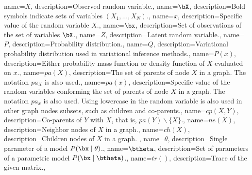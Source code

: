 {
  name={\(X\)},
  description={Observed random variable.},
}
{
  name={\(\bX\)},
  description={Bold symbols indicate sets of variables \((X_{1},\dots,X_{N})\).},
}
{
  name={\(x\)},
  description={Specific value of the random variable \(X\).},
}
{
  name={\(\bx\)},
  description={Set of observations of the set of variables \(\bX\).},
}
{
  name={\ensuremath{Z}},
  description={Latent random variable.},
}
{
  name={\ensuremath{P}},
  description={Probability distribution.},
}
{
  name={\ensuremath{Q}},
  description={Variational probability distribution used in variational inference methods.},
}
{
  name={\ensuremath{P(x)}},
  description={Either probability mass function or density function of \(X\) evaluated on \(x\).},
}
{
  name={\ensuremath{pa(X)}},
  description={The set of parents of node \(X\) in a graph. The notation \(pa_{X}\) is also used.},
}
{
  name={\ensuremath{pa(x)}},
  description={Specific value of the random variables conforming the set of parents of node \(X\) in a graph. The notation \(pa_{x}\) is also used. Using lowercase in the random variable is also used in other graph nodes subsets, such as children and co-parents.},
}
{
  name={\ensuremath{cp(X,Y)}},
  description={Co-parents of \(Y\) with \(X\), that is, \(pa(Y)\backslash \{X\}\).},
}
{
  name={\ensuremath{ne(X)}},
  description={Neighbor nodes of \(X\) in a graph.},
}
{
  name={\ensuremath{ch(X)}},
  description={Children nodes of \(X\) in a graph. },
}
{
  name={\ensuremath{\theta}},
  description={Single parameter of a model \(P(\bx \mid \theta)\).},
}
{
  name={\ensuremath{\btheta}},
  description={Set of parameters of a parametric model \(P(\bx \mid \btheta)\).},
}
{
  name={\ensuremath{tr()}},
  description={Trace of the given matrix.},
}
